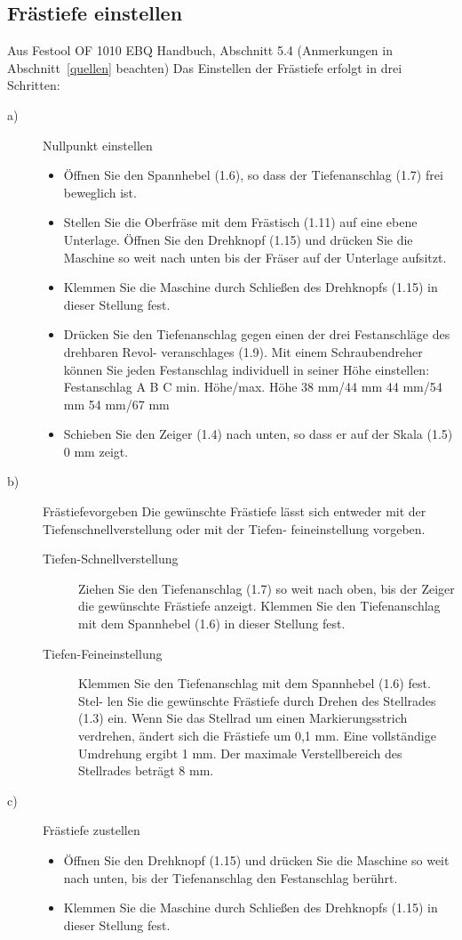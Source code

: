 \documentclass{\basedir/fablab-document}
\begin{document}
\subsection{Frästiefe einstellen}
\begin{leftbar}{Aus Festool OF 1010 EBQ Handbuch, Abschnitt 5.4 (Anmerkungen in Abschnitt~\ref{quellen} beachten)}
Das Einstellen der Frästiefe erfolgt in drei Schritten:
\begin{description}
\item[a)] Nullpunkt einstellen
\begin{itemize}
    \item Öffnen Sie den Spannhebel (1.6), so dass der Tiefenanschlag (1.7) frei beweglich ist.
    \item Stellen Sie die Oberfräse mit dem Frästisch (1.11) auf eine ebene Unterlage. Öffnen Sie den Drehknopf (1.15) und drücken Sie die Maschine so weit nach unten bis der Fräser auf der Unterlage aufsitzt.
    \item Klemmen Sie die Maschine durch Schließen des Drehknopfs (1.15) in dieser Stellung fest.
    \item Drücken Sie den Tiefenanschlag gegen einen der drei Festanschläge des drehbaren Revol- veranschlages (1.9).
Mit einem Schraubendreher können Sie jeden Festanschlag individuell in seiner Höhe einstellen:
Festanschlag
A B C
min. Höhe/max. Höhe
38 mm/44 mm 44 mm/54 mm 54 mm/67 mm
    \item Schieben Sie den Zeiger (1.4) nach unten, so dass er auf der Skala (1.5) 0 mm zeigt.
\end{itemize}
\item[b)] Frästiefevorgeben
Die gewünschte Frästiefe lässt sich entweder mit der Tiefenschnellverstellung oder mit der Tiefen- feineinstellung vorgeben.
\begin{description}
    \item[Tiefen-Schnellverstellung] Ziehen Sie den Tiefenanschlag (1.7) so weit nach oben, bis der Zeiger die gewünschte Frästiefe anzeigt. Klemmen Sie den Tiefenanschlag mit dem Spannhebel (1.6) in dieser Stellung fest.
     \item[Tiefen-Feineinstellung] Klemmen Sie den Tiefenanschlag mit dem Spannhebel (1.6) fest. Stel- len Sie die gewünschte Frästiefe durch Drehen des Stellrades (1.3) ein. Wenn Sie das Stellrad um einen Markierungsstrich verdrehen, ändert sich die Frästiefe um 0,1 mm. Eine vollständige Umdrehung ergibt 1 mm. Der maximale Verstellbereich des Stellrades beträgt 8 mm.
\end{description}
\item[c)] Frästiefe zustellen
\begin{itemize}
    \item Öffnen Sie den Drehknopf (1.15) und drücken Sie die Maschine so weit nach unten, bis der Tiefenanschlag den Festanschlag berührt.
    \item Klemmen Sie die Maschine durch Schließen des Drehknopfs (1.15) in dieser Stellung fest.
\end{itemize}
\end{description}
\end{leftbar}
\end{document}
